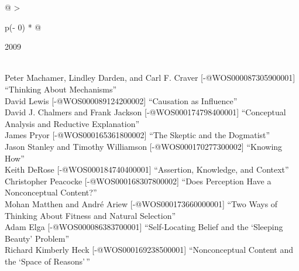 \documentclass[
  10pt,
  letterpaper,
  DIV=11,
  numbers=noendperiod,
  twoside]{scrartcl}
\begin{document}
\begin{longtable}[]{@{}
  >{\raggedright\arraybackslash}p{(\columnwidth - 0\tabcolsep) * }@{}}

\caption{\label{tbl-top-ten-2000}Most cited articles published less than
ten years ago as of 2009.}

\tabularnewline

\toprule\noalign{}
\begin{minipage}[b]{\linewidth}\raggedright
2009
\end{minipage} \\
\midrule\noalign{}
\endhead
\bottomrule\noalign{}
\endlastfoot
Peter Machamer, Lindley Darden, and Carl F. Craver
{[}-@WOS000087305900001{]} ``Thinking About Mechanisms'' \\
David Lewis {[}-@WOS000089124200002{]} ``Causation as Influence'' \\
David J. Chalmers and Frank Jackson {[}-@WOS000174798400001{]}
``Conceptual Analysis and Reductive Explanation'' \\
James Pryor {[}-@WOS000165361800002{]} ``The Skeptic and the
Dogmatist'' \\
Jason Stanley and Timothy Williamson {[}-@WOS000170277300002{]}
``Knowing How'' \\
Keith DeRose {[}-@WOS000184740400001{]} ``Assertion, Knowledge, and
Context'' \\
Christopher Peacocke {[}-@WOS000168307800002{]} ``Does Perception Have a
Nonconceptual Content?'' \\
Mohan Matthen and André Ariew {[}-@WOS000173660000001{]} ``Two Ways of
Thinking About Fitness and Natural Selection'' \\
Adam Elga {[}-@WOS000086383700001{]} ``Self-Locating Belief and the
`Sleeping Beauty' Problem'' \\
Richard Kimberly Heck {[}-@WOS000169238500001{]} ``Nonconceptual Content
and the `Space of Reasons'\,'' \\

\end{longtable}
\end{document}
